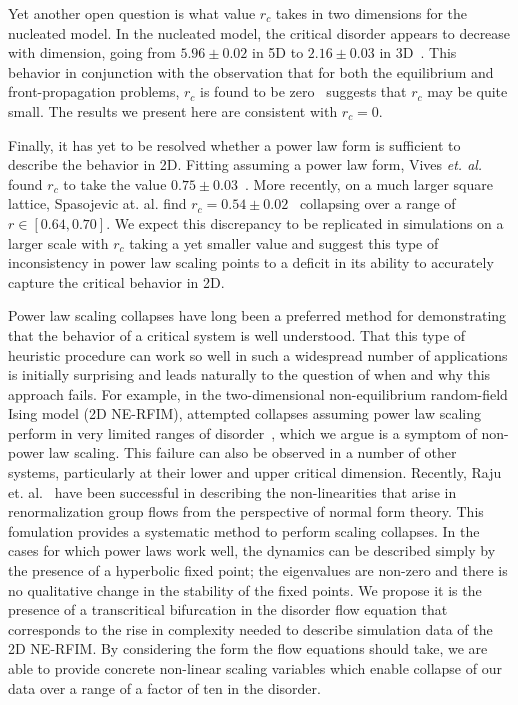 \documentclass[reprint,amsmath,amssymb,aps,floatfix]{revtex4-1}
\begin{document}
%
Yet another open question is what value $r_c$ takes in two dimensions for the nucleated model. In the nucleated model, the critical disorder appears to decrease with dimension, going from $5.96 \pm 0.02$ in 5D to $2.16 \pm 0.03$ in 3D~\cite{Sethna06}. This behavior in conjunction with the observation that for both the equilibrium and front-propagation problems, $r_c$ is found to be zero~\cite{Drossel98} suggests that $r_c$ may be quite small. The results we present here are consistent with $r_c=0$.\par
%
Finally, it has yet to be resolved whether a power law form is sufficient to describe the behavior in 2D.  Fitting assuming a power law form, Vives {\em et. al.} found $r_c$ to take the value $0.75 \pm 0.03$~\cite{Vives95}. More recently, on a much larger square lattice, Spasojevic at. al. find $r_c=0.54\pm0.02$~\cite{Spasojevic11, Spasojevic11-2} collapsing over a range of $r \in [0.64, 0.70]$. We expect this discrepancy to be replicated in simulations on a larger scale with $r_c$ taking a yet smaller value and suggest this type of inconsistency in power law scaling points to a deficit in its ability to accurately capture the critical behavior in 2D.\par
%
Power law scaling collapses have long been a preferred method for demonstrating that the behavior of a critical system is well understood. That this type of heuristic procedure can work so well in such a widespread number of applications is initially surprising and leads naturally to the question of when and why this approach fails. For example, in the two-dimensional non-equilibrium random-field Ising model (2D NE-RFIM),  attempted collapses assuming power law scaling perform in very limited ranges of disorder~\cite{Spasojevic11, Spasojevic11-2, Perkovic96, KuntzPhD}, which we argue is a symptom of non-power law scaling. This failure can also be observed in a number of other systems, particularly at their lower and upper critical dimension. Recently, Raju et. al.~\cite{Raju17} have been successful in describing the non-linearities that arise in renormalization group flows from the perspective of normal form theory. This fomulation provides a systematic method to perform scaling collapses. In the cases for which power laws work well, the dynamics can be described simply by the presence of a hyperbolic fixed point; the eigenvalues are non-zero and there is no qualitative change in the stability of the fixed points. We propose it is the presence of a transcritical bifurcation in the disorder flow equation that corresponds to the rise in complexity needed to describe simulation data of the 2D NE-RFIM. By considering the form the flow equations should take, we are able to provide concrete non-linear scaling variables which enable collapse of our data over a range of a factor of ten in the disorder.\par
\end{document}
